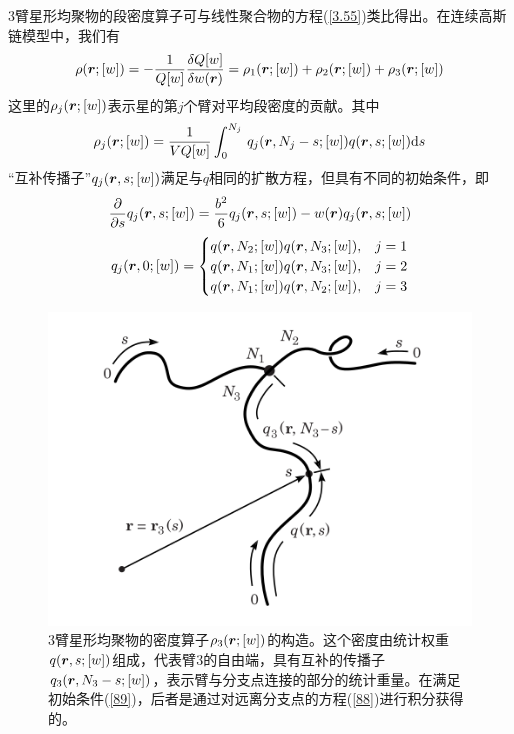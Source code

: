 $3$臂星形均聚物的段密度算子可与线性聚合物的方程(\ref{3.55})类比得出。在连续高斯链模型中，我们有
\begin{equation}
\rho(\bm{r};[w])=-\frac{1}{Q[w]}\frac{\delta Q[w]}{\delta w(\bm{r})}=\rho _1(\bm{r};[w])+\rho _2(\bm{r};[w])+\rho _3(\bm{r};[w])
\end{equation}
这里的$\rho _j(\bm{r};[w])$表示星的第$j$个臂对平均段密度的贡献。其中
\begin{equation}
\rho _{j}(\bm{r};[w])=\frac{1}{VQ[w]} \int_{0}^{N_j}\,q_{j}(\bm{r},N_{j}-s;[w])q(\bm{r},s;[w]) \mathrm{d}s \label{87}
\end{equation}
“互补传播子”$q_{j}(\bm{r},s;[w])$满足与$q$相同的扩散方程，但具有不同的初始条件，即
\begin{equation}
\frac{\partial}{\partial s}q_j(\bm{r},s;[w])=\frac{b^2}{6}q_j(\bm{r},s;[w])-w(\bm{r})q_j(\bm{r},s;[w]) \label{88}
\end{equation}
\begin{equation}
q_j(\bm{r},0;[w])=
\begin{cases}
q(\bm{r},N_2;[w])q(\bm{r},N_3;[w]), & j=1 \\
q(\bm{r},N_1;[w])q(\bm{r},N_3;[w]), & j=2 \\
q(\bm{r},N_1;[w])q(\bm{r},N_2;[w]), & j=3  \label{89}
\end{cases}
\end{equation}

\begin{figure}[H]
\centering
\includegraphics[scale=0.7]{./figures/35.png}
\caption{$3$臂星形均聚物的密度算子$\rho _3(\bm{r};[w])$的构造。这个密度由统计权重$q(\bm{r},s;[w])$组成，代表臂$3$的自由端，具有互补的传播子$q_3(\bm{r},N_3-s;[w])$，表示臂与分支点连接的部分的统计重量。在满足初始条件(\ref{89})，后者是通过对远离分支点的方程(\ref{88})进行积分获得的。}
\label{三臂星形图像}
\end{figure}

